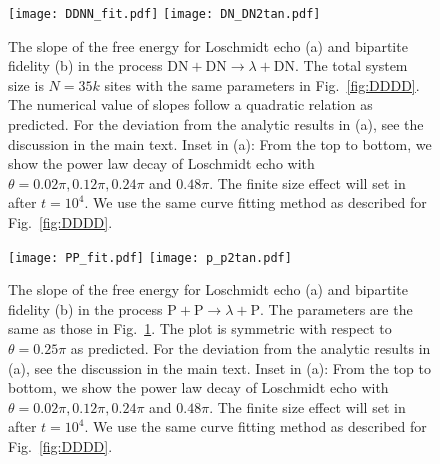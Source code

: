 \begin{figure}
  \centering
\texttt{[image: DDNN\_fit.pdf]}
\texttt{[image: DN\_DN2tan.pdf]}
    \caption{The slope of the free energy for Loschmidt echo (a) and bipartite fidelity (b) in the process $\text{DN}+\text{DN}\rightarrow\lambda+\text{DN}$. The total system size is $N=35k$ sites with the same parameters in Fig.~\ref{fig:DDDD}. The numerical value of slopes follow a quadratic relation as predicted. For the deviation from the analytic results in (a), see the discussion in the main text. Inset in (a): From the top to bottom, we show the power law decay of Loschmidt echo with $\theta=0.02\pi, 0.12\pi,0.24\pi$ and $0.48\pi$. The finite size effect will set in after $t=10^{4}$. We use the same curve fitting method as described for Fig.~\ref{fig:DDDD}.}
      \label{fig:DDNN}
\end{figure}


\begin{figure}
  \centering
  \texttt{[image: PP\_fit.pdf]}
    \texttt{[image: p\_p2tan.pdf]}
    \caption{The slope of the free energy for Loschmidt echo (a) and bipartite fidelity (b) in the process $\text{P}+\text{P}\rightarrow\lambda+\text{P}$. The parameters are the same as those in Fig.~\ref{fig:DDNN}. The plot is symmetric with respect to $\theta=0.25\pi$ as predicted. For the deviation from the analytic results in (a), see the discussion in the main text. Inset in (a): From the top to bottom, we show the power law decay of Loschmidt echo with $\theta=0.02\pi, 0.12\pi,0.24\pi$ and $0.48\pi$. The finite size effect will set in after $t=10^{4}$. We use the same curve fitting method as described for Fig.~\ref{fig:DDDD}.}
    \label{fig:PPPP}
\end{figure}

